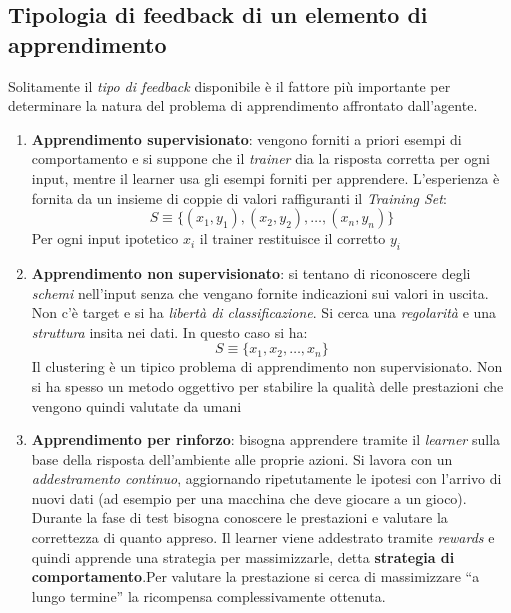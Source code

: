 \subsection{Tipologia di feedback di un elemento di apprendimento}
Solitamente il \textit{tipo di feedback} disponibile è il fattore più importante per determinare la natura del problema di apprendimento affrontato dall'agente.
\begin{enumerate}
  \item \textbf{Apprendimento supervisionato}: vengono forniti a priori
  esempi di comportamento e si suppone che il \textit{trainer} dia la risposta
  corretta per ogni input, mentre il learner usa gli esempi forniti per
  apprendere. L'esperienza è fornita da un insieme di coppie di valori raffiguranti il \textit{Training Set}:
  \[S\equiv\{(x_1, y_1),(x_2, y_2),\ldots,(x_n, y_n)\}\]
  Per ogni input ipotetico $x_i$ il trainer restituisce il corretto
  $y_i$
  \item \textbf{Apprendimento non supervisionato}: si tentano di riconoscere degli
  \textit{schemi} nell'input senza che vengano fornite indicazioni sui valori in uscita. Non c'è
  target e si ha \textit{libertà di classificazione}. Si cerca una
  \textit{regolarità} e una \textit{struttura} insita nei dati. In questo caso
  si ha: 
  \[S\equiv\{x_1, x_2,\ldots, x_n\}\]
  Il clustering è un tipico problema di apprendimento non supervisionato. Non si
  ha spesso un metodo oggettivo per stabilire la qualità delle prestazioni che vengono quindi
  valutate da umani
  \item \textbf{Apprendimento per rinforzo}: bisogna apprendere tramite il
  \textit{learner} sulla base della risposta dell’ambiente alle proprie azioni. Si lavora con
  un \textit{addestramento continuo}, aggiornando ripetutamente le ipotesi con l'arrivo di
  nuovi dati (ad esempio per una macchina che deve giocare a un gioco). Durante la
  fase di test bisogna conoscere le prestazioni e valutare la correttezza di
  quanto appreso. Il learner viene addestrato tramite \textit{rewards} e quindi
  apprende una strategia per massimizzarle, detta
  \textbf{strategia di comportamento}.Per valutare la prestazione si cerca di
  massimizzare ``a lungo termine'' la ricompensa complessivamente ottenuta.
\end{enumerate}
